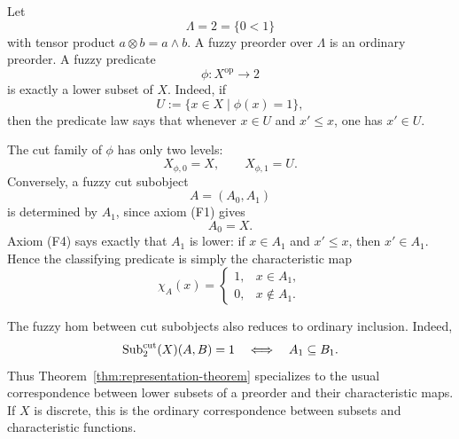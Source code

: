 \begin{example}
\label{ex:cut-subobjects-crisp}
    Let
    \[
        \Lambda=2=\{0<1\}
    \]
    with tensor product \(a\otimes b=a\wedge b\). A fuzzy preorder over \(\Lambda\) is an ordinary preorder. A fuzzy predicate
    \[
        \phi:X^{\mathrm{op}}\to 2
    \]
    is exactly a lower subset of \(X\). Indeed, if
    \[
        U:=\{x\in X\mid \phi(x)=1\},
    \]
    then the predicate law says that whenever \(x\in U\) and \(x'\leq x\), one has \(x'\in U\).

    The cut family of \(\phi\) has only two levels:
    \[
        X_{\phi,0}=X,
        \qquad
        X_{\phi,1}=U.
    \]
    Conversely, a fuzzy cut subobject
    \[
        A=(A_0,A_1)
    \]
    is determined by \(A_1\), since axiom \textup{(F1)} gives
    \[
        A_0=X.
    \]
    Axiom \textup{(F4)} says exactly that \(A_1\) is lower: if \(x\in A_1\) and \(x'\leq x\), then \(x'\in A_1\). Hence the classifying predicate is simply the characteristic map
    \[
        \chi_A(x)=
        \begin{cases}
            1, & x\in A_1,\\
            0, & x\notin A_1.
        \end{cases}
    \]

    The fuzzy hom between cut subobjects also reduces to ordinary inclusion. Indeed,
    \[
        \mathrm{Sub}^{\mathrm{cut}}_2(X)(A,B)=1
        \quad\Longleftrightarrow\quad
        A_1\subseteq B_1.
    \]
    Thus Theorem~\ref{thm:representation-theorem} specializes to the usual correspondence between lower subsets of a preorder and their characteristic maps. If \(X\) is discrete, this is the ordinary correspondence between subsets and characteristic functions.
\end{example}

